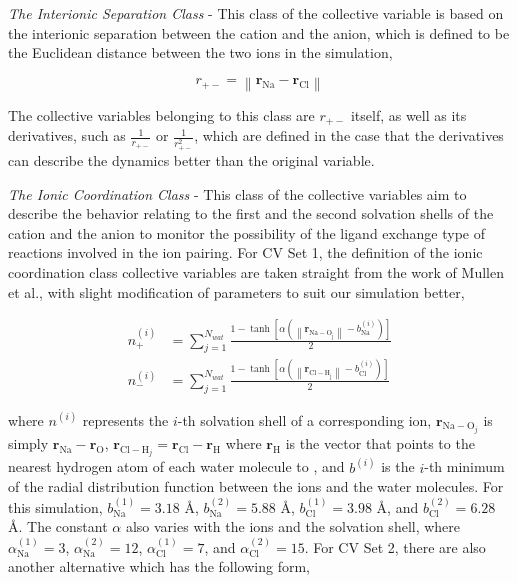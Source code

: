 \begin{spacing}{2.0}
    \textsl{The Interionic Separation Class} - This class of the collective variable is based on the interionic separation between the cation and 
    the anion, which is defined to be the Euclidean distance between the two ions in the simulation,

    \begin{equation}
        r_{+-} = \left\lVert \mathbf{r}_{\mathrm{Na}} - \mathbf{r}_{\mathrm{Cl}} \right\rVert
    \end{equation}

    The collective variables belonging to this class are $r_{+-}$ itself, as well as its derivatives, such as $\frac{1}{r_{+-}}$ or 
    $\frac{1}{r_{+-}^2}$, which are defined in the case that the derivatives can describe the dynamics better than the original variable.

    \textsl{The Ionic Coordination Class} - This class of the collective variables aim to describe the behavior relating to the first and the second 
    solvation shells of the cation and the anion to monitor the possibility of the ligand exchange type of reactions involved in the ion pairing. 
    For CV Set 1, the definition of the ionic coordination class collective variables are taken straight from the work of Mullen et al., with slight 
    modification of parameters to suit our simulation better,

    \begin{equation}\begin{aligned}
        n_+^{(i)} &= \sum_{j=1}^{N_{wat}}\frac{1-\tanh\left[\alpha\left(\left\lVert\mathbf{r}_{\mathrm{Na-O_j}}\right\rVert - b_{\mathrm{Na}}^{(i)}\right)\right]}{2} \\
        n_-^{(i)} &= \sum_{j=1}^{N_{wat}}\frac{1-\tanh\left[\alpha\left(\left\lVert\mathbf{r}_{\mathrm{Cl-H_j}}\right\rVert - b_{\mathrm{Cl}}^{(i)}\right)\right]}{2}
    \end{aligned}\end{equation}

    \noindent where $n^{(i)}$ represents the $i$-th solvation shell of a corresponding ion, $\mathbf{r}_{\mathrm{Na-O}_j}$ is simply 
    $\mathbf{r}_{\mathrm{Na}} - \mathbf{r}_{\mathrm{O}}$, $\mathbf{r}_{\mathrm{Cl-H}_j} = \mathbf{r}_{\mathrm{Cl}} - \mathbf{r}_{\mathrm{H}}$ where 
    $\mathbf{r}_{\mathrm{H}}$ is the vector that points to the nearest hydrogen atom of each water molecule to , and $b^{(i)}$ is the
    $i$-th minimum of the radial distribution function between the ions and the water molecules. For this simulation, $b_{\mathrm{Na}}^{(1)} = 3.18$ \r{A},
    $b_{\mathrm{Na}}^{(2)} = 5.88$ \r{A}, $b_{\mathrm{Cl}}^{(1)} = 3.98$ \r{A}, and $b_{\mathrm{Cl}}^{(2)} = 6.28$ \r{A}. The constant $\alpha$ also
    varies with the ions and the solvation shell, where $\alpha_{\mathrm{Na}}^{(1)} = 3$, $\alpha_{\mathrm{Na}}^{(2)} = 12$, $\alpha_{\mathrm{Cl}}^{(1)} = 7$,
    and $\alpha_{\mathrm{Cl}}^{(2)} = 15$. For CV Set 2, there are also another alternative which has the following form,


\end{spacing}
